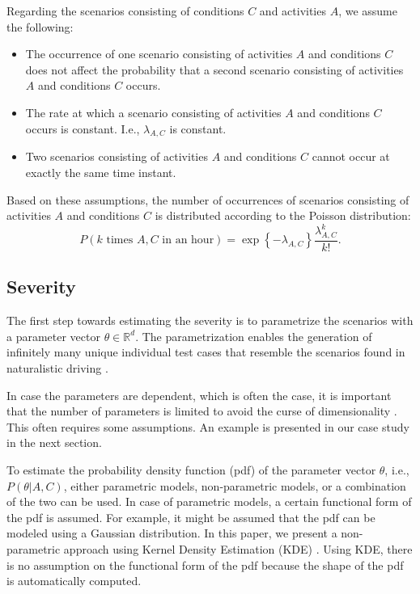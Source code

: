 Regarding the scenarios consisting of conditions $C$ and activities $A$, we assume the following:
\begin{itemize}
	\item The occurrence of one scenario consisting of activities $A$ and conditions $C$ does not affect the probability that a second scenario consisting of activities $A$ and conditions $C$ occurs.
	\item The rate at which a scenario consisting of activities $A$ and conditions $C$ occurs is constant. I.e., $\lambda_{A,C}$ is constant.
	\item Two scenarios consisting of activities $A$ and conditions $C$ cannot occur at exactly the same time instant.
\end{itemize}
Based on these assumptions, the number of occurrences of scenarios consisting of activities $A$ and conditions $C$ is distributed according to the Poisson distribution:
\begin{equation}
	P(k\text{ times }A,C\text{ in an hour}) = \exp \left\{-\lambda_{A,C} \right\} \frac{\lambda_{A,C}^k}{k!}.
\end{equation}



\subsection{Severity}

The first step towards estimating the severity is to parametrize the scenarios with a parameter vector $\theta \in \mathbb{R}^d$. The parametrization enables the generation of infinitely many unique individual test cases that resemble the scenarios found in naturalistic driving \cite{deGelder2017assessment,elrofai2018scenario}.

In case the parameters are dependent, which is often the case, it is important that the number of parameters is limited to avoid the curse of dimensionality \cite{scott2015multivariate}. This often requires some assumptions. An example is presented in our case study in the next section.

To estimate the probability density function (pdf) of the parameter vector $\theta$, i.e., $P(\theta|A,C)$, either parametric models, non-parametric models, or a combination of the two can be used. In case of parametric models, a certain functional form of the pdf is assumed. For example, it might be assumed that the pdf can be modeled using a Gaussian distribution. In this paper, we present a non-parametric approach using Kernel Density Estimation (KDE) \cite{rosenblatt1956remarks, parzen1962estimation}. Using KDE, there is no assumption on the functional form of the pdf because the shape of the pdf is automatically computed.

